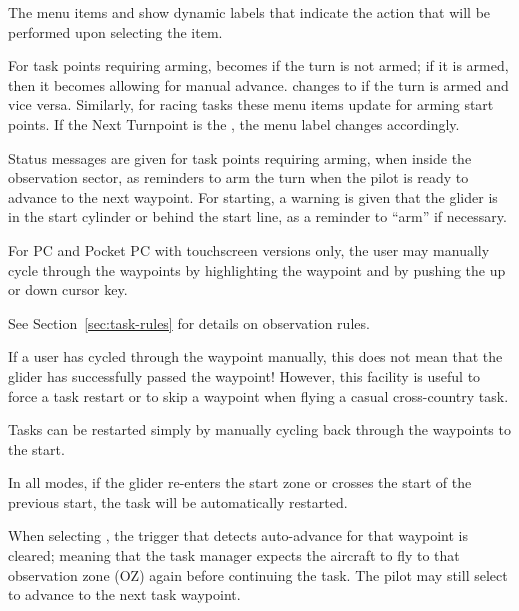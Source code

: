 The menu items  and
 show dynamic labels that
indicate the action that will be performed upon selecting the item.

For task points requiring arming,  becomes
 if the turn is not armed; if it is armed, then it becomes
 allowing for manual advance.
 changes to  if the turn is armed
and vice versa. Similarly, for racing tasks these menu items update for arming
start points. If the Next Turnpoint is the , the menu
label changes accordingly.

Status messages are given for task points requiring arming, when
inside the observation sector, as reminders to arm the turn when the
pilot is ready to advance to the next waypoint. For starting, a
warning is given that the glider is in the start cylinder or behind
the start line, as a reminder to ``arm'' if necessary.

For PC and Pocket PC with touchscreen versions only, the user may
manually cycle through the waypoints by highlighting the waypoint
{\InfoBox} and by pushing the up or down cursor key.

See Section~\ref{sec:task-rules} for details on observation rules.

If a user has cycled through the waypoint manually, this does not mean
that the glider has successfully passed the waypoint!  However, this
facility is useful to force a task restart or to skip a waypoint when
flying a casual cross-country task.

\tip Tasks can be restarted simply by manually cycling back through the
waypoints to the start.

In all modes, if the glider re-enters the start zone or crosses the
start of the previous start, the task will be automatically restarted.

When selecting , the trigger that detects
auto-advance for that waypoint is cleared; meaning that the task
manager expects the aircraft to fly to that observation zone (OZ)
again before continuing the task. The pilot may still select  to advance to the next task waypoint.


